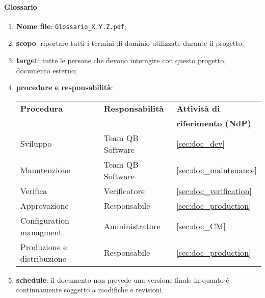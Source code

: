         \paragraph{Glossario}
        	\begin{enumerate}
        	\item \textbf{Nome file}: \texttt{Glossario\_X.Y.Z.pdf};
        	\item \textbf{scopo}: riportare tutti i termini di dominio utilizzate durante il progetto;
        	\item \textbf{target}: tutte le persone che devono interagire con questo progetto, documento esterno;
        	\item \textbf{procedure e responsabilità}:
        	\\
        	\begin{tabularx}{0.93\textwidth}{|X|X|X|}
        		\hline
        		\textbf{Procedura} & \textbf{Responsabilità} & \textbf{Attività di} \\
        		& & \textbf{riferimento (NdP)} \\
        		\hline
        		Sviluppo & Team QB Software &  \ref{sec:doc_dev}
        		\\\hline
        		Manutenzione & Team QB Software & \ref{sec:doc_maintenance} 
        		\\\hline
        		Verifica & Verificatore & \ref{sec:doc_verification}
        		\\\hline
        		Approvazione & Responsabile & \ref{sec:doc_production}
        		\\\hline
        		Configuration managment & Amministratore & \ref{sec:doc_CM}
        		\\\hline
        		Produzione e distribuzione & Responsabile & \ref{sec:doc_production}
        		\\\hline
        	\end{tabularx}
        	\item \textbf{schedule}: il documento non prevede una versione finale in quanto è continuamente soggetto a modifiche e revisioni. 
        \end{enumerate}

